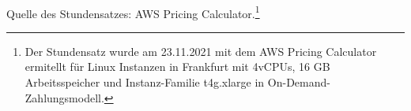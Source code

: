 \\\\
\\\\
\\\\ 
Quelle des Stundensatzes: AWS Pricing Calculator.\footnote{Der Stundensatz wurde am 23.11.2021 mit dem AWS Pricing Calculator ermitellt für Linux Instanzen in Frankfurt mit 4vCPUs, 16 GB Arbeitsspeicher und Instanz-Familie t4g.xlarge in On-Demand-Zahlungsmodell\cite{AMZ17}.}
\newpage
